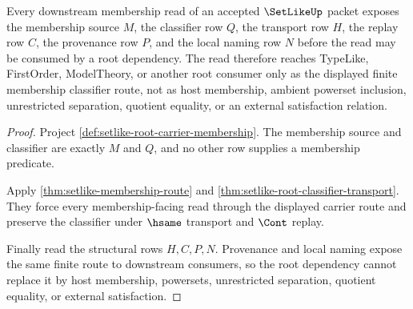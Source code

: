 \begin{theorem}\label{thm:setlike-membership-classifier-root-unblock}
Every downstream membership read of an accepted $\SetLikeUp$ packet exposes the membership source $M$, the classifier row $Q$, the transport row $H$, the replay row $C$, the provenance row $P$, and the local naming row $N$ before the read may be consumed by a root dependency. The read therefore reaches TypeLike, FirstOrder, ModelTheory, or another root consumer only as the displayed finite membership classifier route, not as host membership, ambient powerset inclusion, unrestricted separation, quotient equality, or an external satisfaction relation.
\end{theorem}
\begin{proof}
Project \autoref{def:setlike-root-carrier-membership}. The membership source and classifier are exactly $M$ and $Q$, and no other row supplies a membership predicate.

Apply \autoref{thm:setlike-membership-route} and \autoref{thm:setlike-root-classifier-transport}. They force every membership-facing read through the displayed carrier route and preserve the classifier under $\hsame$ transport and $\Cont$ replay.

Finally read the structural rows $H,C,P,N$. Provenance and local naming expose the same finite route to downstream consumers, so the root dependency cannot replace it by host membership, powersets, unrestricted separation, quotient equality, or external satisfaction.
\end{proof}

